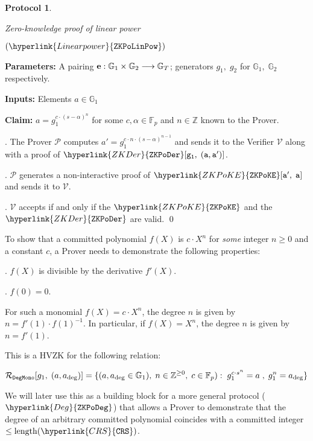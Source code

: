\documentclass[11pt, lettersize, notitlepage, leqno, footskip=0.6cm]{article}
\newcommand{\bz}{\mathbb Z}
\newcommand{\bFp}{\mathbb{F}_p}
\newcommand{\lra}{\longrightarrow}
\newcommand{\mc}{\mathcal}
\newcommand{\mb}{\mathbb}
\newcommand{\mr}{\mathrm}
\newcommand{\al}{\alpha}
\newcommand{\mP}{\mc{P}}
\newcommand{\V}{\mc{V}}
\newcommand{\noin}{\noindent}
\newtheorem{Prot}[Thm]{Protocol}
\numberwithin{equation}{section}
\begin{document}
\begin{mdframed}
\begin{Prot} \hypertarget{LinPow}{Zero-knowledge proof of linear power} $(\hyperlink{Linear power}{\tt{ZKPoLinPow}})$\end{Prot}  

\noin \textbf{Parameters:} A pairing ${\bf{e}}:\mb{G}_1\times \mb{G}_2\lra \mb{G}_T$; generators $g_1,\;g_2$ for $\mb{G}_1,\; \mb{G}_2$ respectively.


\noindent \textbf{Inputs:} Elements $a\in \mb{G}_1$

\noindent \textbf{Claim:} $a = g_1^{c\cdot (s-\al)^n}$ for some $c,\al\in \bFp$ and $n\in \bz$ known to the Prover. \vspace{2mm}

. The Prover $\mP$ computes $a' = g_1^{c\cdot n\cdot (s-\al)^{n-1}}$ and sends it to the Verifier $\V$ along with a proof of $\hyperlink{ZKDer}{\tt{ZKPoDer}}[g_1,\;(a,a')]$.

\noin 2. $\mP$ generates a non-interactive proof of $\hyperlink{ZKPoKE}{\tt{ZKPoKE}}[a',\;a]$ and sends it to $\V$.

\noin 3. $\V$ accepts if and only if the $\hyperlink{ZKPoKE}{\tt{ZKPoKE}}$ and the $\hyperlink{ZKDer}{\tt{ZKPoDer}}$ are valid.  \qed 
\end{mdframed}

\bigskip

To show that a committed polynomial $f(X)$ is $c\cdot X^n$ for \textit{some} integer $n\geq 0$ and a constant $c$, a Prover needs to demonstrate the following properties: \vspace{2mm}

\noin 1. $f(X)$ is divisible by the derivative $f'(X)$. \vspace{1mm}

\noin 2. $f(0) = 0$. \vspace{1mm}

For such a monomial $f(X) = c\cdot X^n$, the degree $n$ is given by $n = f'(1)\cdot f(1)^{-1}$. In particular, if  $f(X) = X^n$, the degree $n$ is given by $n = f'(1)$.   

This is a HVZK for the following relation:

\vspace{-5mm} $$\mc{R}_{\tt{DegMono}}[g_1,\;(a, a_{\deg})] = \{
(a,a_{\deg} \in \mb{G}_1),\; n\in \bz^{\geq 0},\;c\in\bFp):\; g_1^{c\cdot s^n} = a\;,\; g_1^{n} = a_{\deg} \}  $$


We will later use this as a building block for a more general protocol ($\hyperlink{Deg}{\tt{ZKPoDeg}}$) that allows a Prover to demonstrate that the degree of an arbitrary committed polynomial coincides with a committed integer $\leq \mr{length}({\hyperlink{CRS}{\tt{CRS}}})$.
\end{document}
